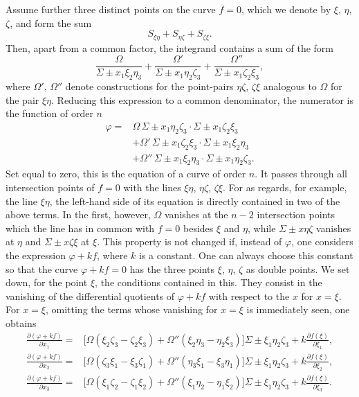 \documentclass[10pt]{article}
\begin{document}
Assume further three distinct points on the curve $f=0$, which we denote by $\xi$, $\eta$, $\zeta$, and form the sum
\[
S_{\xi\eta}+S_{\eta\zeta}+S_{\zeta\xi}.
\]
Then, apart from a common factor, the integrand contains a sum of the form
\[
\frac{\Omega}{\Sigma\pm x_1\xi_2\eta_3}
+\frac{\Omega'}{\Sigma\pm x_1\eta_2\zeta_3}
+\frac{\Omega''}{\Sigma\pm x_1\zeta_2\xi_3},
\]
where $\Omega'$, $\Omega''$ denote constructions for the point-pairs $\eta\zeta$, $\zeta\xi$ analogous to $\Omega$ for the pair $\xi\eta$. Reducing this expression to a common denominator, the numerator is the function of order $n$
\[
\begin{aligned}
\varphi={}&\Omega\,\Sigma\pm x_1\eta_2\zeta_3\cdot\Sigma\pm x_1\zeta_2\xi_3\\
&+\Omega'\,\Sigma\pm x_1\zeta_2\xi_3\cdot\Sigma\pm x_1\xi_2\eta_3\\
&+\Omega''\,\Sigma\pm x_1\xi_2\eta_3\cdot\Sigma\pm x_1\eta_2\zeta_3.
\end{aligned}
\]
Set equal to zero, this is the equation of a curve of order $n$. It passes through all intersection points of $f=0$ with the lines $\xi\eta$, $\eta\zeta$, $\zeta\xi$. For as regards, for example, the line $\xi\eta$, the left-hand side of its equation is directly contained in two of the above terms. In the first, however, $\Omega$ vanishes at the $n-2$ intersection points which the line has in common with $f=0$ besides $\xi$ and $\eta$, while $\Sigma\pm x\eta\zeta$ vanishes at $\eta$ and $\Sigma\pm x\zeta\xi$ at $\xi$. This property is not changed if, instead of $\varphi$, one considers the expression $\varphi+kf$, where $k$ is a constant. One can always choose this constant so that the curve $\varphi+kf=0$ has the three points $\xi$, $\eta$, $\zeta$ as double points. We set down, for the point $\xi$, the conditions contained in this. They consist in the vanishing of the differential quotients of $\varphi+kf$ with respect to the $x$ for $x=\xi$. For $x=\xi$, omitting the terms whose vanishing for $x=\xi$ is immediately seen, one obtains
\[
\begin{aligned}
\frac{\partial(\varphi+kf)}{\partial x_1}
={}&\bigl[\Omega(\xi_2\zeta_3-\zeta_2\xi_3)+\Omega''(\xi_2\eta_3-\eta_2\xi_3)\bigr]\Sigma\pm \xi_1\eta_2\zeta_3+k\frac{\partial f(\xi)}{\partial \xi_1},\\
\frac{\partial(\varphi+kf)}{\partial x_2}
={}&\bigl[\Omega(\zeta_3\xi_1-\xi_3\zeta_1)+\Omega''(\eta_3\xi_1-\xi_3\eta_1)\bigr]\Sigma\pm \xi_1\eta_2\zeta_3+k\frac{\partial f(\xi)}{\partial \xi_2},\\
\frac{\partial(\varphi+kf)}{\partial x_3}
={}&\bigl[\Omega(\xi_1\zeta_2-\zeta_1\xi_2)+\Omega''(\xi_1\eta_2-\eta_1\xi_2)\bigr]\Sigma\pm \xi_1\eta_2\zeta_3+k\frac{\partial f(\xi)}{\partial \xi_3}.
\end{aligned}
\]
\end{document}
